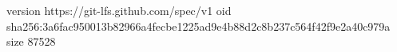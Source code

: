 version https://git-lfs.github.com/spec/v1
oid sha256:3a6fac950013b82966a4fecbe1225ad9e4b88d2c8b237c564f42f9e2a40c979a
size 87528
